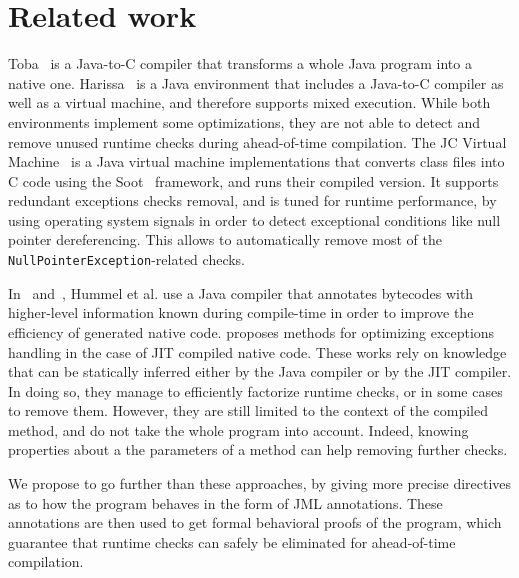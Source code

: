 
\section{Related work}
\label{sec:relatedwork}
Toba~\cite{Proebsting1997} is a Java-to-C compiler that transforms a whole Java program into a native one. Harissa~\cite{Muller1997} is a Java environment that includes a Java-to-C compiler as well as a virtual machine, and therefore supports mixed execution. While both environments implement some optimizations, they are not able to detect and remove unused runtime checks during ahead-of-time compilation. The JC Virtual Machine~\cite{JCVM} is a Java virtual machine implementations that converts class files into C code using the Soot~\cite{Raja1999} framework, and runs their compiled version. It supports redundant exceptions checks removal, and is tuned for runtime performance, by using operating system signals in order to detect exceptional conditions like null pointer dereferencing. This allows to automatically remove most of the \texttt{NullPointerException}-related checks.

In~\cite{Hummel1997} and~\cite{Azevedo1999}, Hummel et al. use a Java compiler that annotates bytecodes with higher-level information known during compile-time in order to improve the efficiency of generated native code. \cite{Ishizaki1999} proposes methods for optimizing exceptions handling in the case of JIT compiled native code. These works rely on knowledge that can be statically inferred either by the Java compiler or by the JIT compiler. In doing so, they manage to efficiently factorize runtime checks, or in some cases to remove them. However, they are still limited to the context of the compiled method, and do not take the whole program into account. Indeed, knowing properties about a the parameters of a method can help removing further checks.

We propose to go further than these approaches, by giving more precise directives as to how the program behaves in the form of JML annotations. These annotations are then used to get formal behavioral proofs of the program, which guarantee that runtime checks can safely be eliminated for ahead-of-time compilation.

